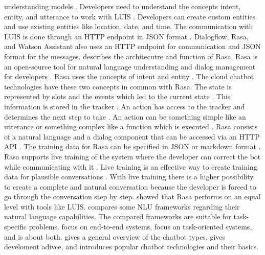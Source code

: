 understanding models \cite{luis2015williams}.
Developers need to understand the concepts intent, entity, and utterance to work with LUIS \cite{luis2015williams}.
Developers can create custom entities and use existing entities like location, date, and time.
The communication with LUIS is done through an HTTP endpoint in JSON format \cite{luis2015williams}. 
Dialogflow, Rasa, and Watson Assistant also uses an HTTP endpoint for communication and JSON format for the messages. 
\citet{rasabocklisch2017} describes the architecutre and function of Rasa.
Rasa is an open-source tool for natural language understanding and dialog management for developers \cite{rasabocklisch2017}.
Rasa uses the concepts of intent and entity \cite{rasabocklisch2017}. 
The cloud chatbot technologies have these two concepts in common with Rasa.
The state is represented by slots and the events which led to the current state \cite{rasabocklisch2017}. 
This information is stored in the tracker \cite{rasabocklisch2017}.
An action has access to the tracker and determines the next step to take \cite{rasabocklisch2017}. 
An action can be something simple like an utterance or something complex like a function which is executed \cite{rasabocklisch2017}.
Rasa consists of a natural language and a dialog component that can be accessed via an HTTP API \cite{rasabocklisch2017}.
The training data for Rasa can be specified in JSON or markdown format \cite{rasabocklisch2017}.
Rasa supports live training of the system where the developer can correct the bot while communicating with it \cite{rasabocklisch2017}.
Live training is an effective way to create training data for plausible conversations \cite{rasabocklisch2017}.
With live training there is a higher possibility to create a complete and natural conversation because the 
developer is forced to go through the conversation step by step.
\citet{braunEvaluatingNLU} showed that Rasa performs on an equal level with tools like LUIS.
\citet{braunEvaluatingNLU} compares some NLU frameworks regarding their natural language capabilities.
The compared frameworks are suitable for task-specific problems.
\citet{evaluateChatbotsShawar2007,bordes2016learning,williams2017hybrid} 
focus on end-to-end systems, \citet{braunEvaluatingNLU, dutta2017developing,luis2015williams,rasabocklisch2017,pharmacybot,gregori2017evaluation}
focus on task-oriented systems, and \citet{singhbuilding} is about both.
\citet{singhbuilding} gives a general overview of the chatbot types, gives develoment adivce, and introduces 
popular chatbot technologies and their basics.
